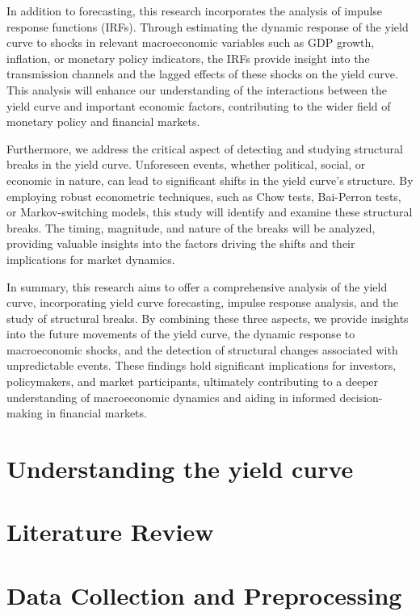 \documentclass{vegaarticle}
\begin{document}
        In addition to forecasting, this research incorporates the analysis of impulse response functions (IRFs). Through estimating the dynamic response of the yield curve to shocks in relevant macroeconomic variables such as GDP growth, inflation, or monetary policy indicators, the IRFs provide insight into the transmission channels and the lagged effects of these shocks on the yield curve. This analysis will enhance our understanding of the interactions between the yield curve and important economic factors, contributing to the wider field of monetary policy and financial markets.
        
        Furthermore, we address the critical aspect of detecting and studying structural breaks in the yield curve. Unforeseen events, whether political, social, or economic in nature, can lead to significant shifts in the yield curve's structure. By employing robust econometric techniques, such as Chow tests, Bai-Perron tests, or Markov-switching models, this study will identify and examine these structural breaks. The timing, magnitude, and nature of the breaks will be analyzed, providing valuable insights into the factors driving the shifts and their implications for market dynamics.
        
        In summary, this research aims to offer a comprehensive analysis of the yield curve, incorporating yield curve forecasting, impulse response analysis, and the study of structural breaks. By combining these three aspects, we provide insights into the future movements of the yield curve, the dynamic response to macroeconomic shocks, and the detection of structural changes associated with unpredictable events. These findings hold significant implications for investors, policymakers, and market participants, ultimately contributing to a deeper understanding of macroeconomic dynamics and aiding in informed decision-making in financial markets.
            
    \section{Understanding the yield curve}
        

    \section{Literature Review}
        

    \section{Data Collection and Preprocessing}
        
    
\end{document}
